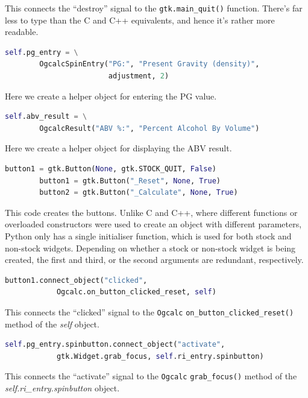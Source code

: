\documentclass[a4paper,oneside]{article}
\newcommand{\variable}[1]{\textsl{#1}}
\newcommand{\class}[1]{\texttt{#1}}
\newcommand{\function}[1]{\texttt{#1()}}
\begin{document}
This connects the ``destroy'' signal to the \function{gtk.main\_quit}
function.  There's far less to type than the C and C++ equivalents,
and hence it's rather more readable.

\begin{lstlisting}[numbers=none, language=Python]
        self.pg_entry = \
        OgcalcSpinEntry("PG:", "Present Gravity (density)",
                        adjustment, 2)
\end{lstlisting}

Here we create a helper object for entering the PG value.

\begin{lstlisting}[numbers=none, language=Python]
        self.abv_result = \
        OgcalcResult("ABV %:", "Percent Alcohol By Volume")
\end{lstlisting}

Here we create a helper object for displaying the ABV result.

\begin{lstlisting}[numbers=none, language=Python]
        button1 = gtk.Button(None, gtk.STOCK_QUIT, False)
        button1 = gtk.Button("_Reset", None, True)
        button2 = gtk.Button("_Calculate", None, True)
\end{lstlisting}

This code creates the buttons.  Unlike C and C++, where different
functions or overloaded constructors were used to create an object
with different parameters, Python only has a single initialiser
function, which is used for both stock and non-stock widgets.
Depending on whether a stock or non-stock widget is being created, the
first and third, or the second arguments are redundant, respectively.

\begin{lstlisting}[numbers=none, language=Python]
        button1.connect_object("clicked",
            Ogcalc.on_button_clicked_reset, self)
\end{lstlisting}

This connects the ``clicked'' signal to the \class{Ogcalc}
\function{on\_button\_clicked\_reset} method of the \variable{self}
object.

\begin{lstlisting}[numbers=none, language=Python]
        self.pg_entry.spinbutton.connect_object("activate",
            gtk.Widget.grab_focus, self.ri_entry.spinbutton)
\end{lstlisting}

This connects the ``activate'' signal to the \class{Ogcalc}
\function{grab\_focus} method of the
\variable{self.ri\_entry.spinbutton} object.
\end{document}
